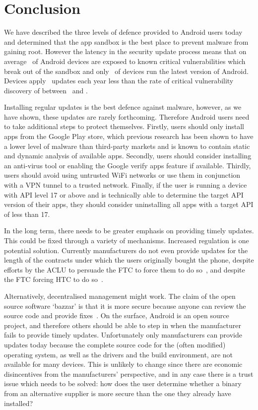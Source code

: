 \documentclass{llncs}
\begin{document}
\section{Conclusion}
\label{sec:conclusion}
We have described the three levels of defence provided to Android users today and determined that the app sandbox is the best place to prevent malware from gaining root.
However the latency in the security update process means that on average \daMeanInsecurityPerc\ of Android devices are exposed to known critical vulnerabilities which break out of the sandbox and only \daUpdatednessPerc\ of devices run the latest version of Android.
Devices apply \daUpdatesPerYear\ updates each year less than the rate of critical vulnerability discovery of between \avoVulnsPerYearAllAndroid\ and \avoVulnsPerYear.

Installing regular updates is the best defence against malware, however, as we have shown, these updates are rarely forthcoming. 
Therefore Android users need to take additional steps to protect themselves. 
Firstly, users should only install apps from the Google Play store, which previous research has been shown to have a lower level of malware than third-party markets and is known to contain static and dynamic analysis of available apps.
Secondly, users should consider installing an anti-virus tool or enabling the Google verify apps feature if available. 
Thirdly, users should avoid using untrusted WiFi networks or use them in conjunction with a VPN tunnel to a trusted network. 
Finally, if the user is running a device with API level 17 or above and is technically able to determine the target API version of their apps, they should consider uninstalling all apps with a target API of less than 17.

In the long term, there needs to be greater emphasis on providing timely updates.
This could be fixed through a variety of mechanisms.
Increased regulation is one potential solution.
Currently manufacturers do not even provide updates for the length of the contracts under which the users originally bought the phone, despite efforts by the ACLU to persuade the FTC to force them to do so~\cite{Soghoian2013}, and despite the FTC forcing HTC to do so~\cite{FTCHTC2013}.

Alternatively, decentralised management might work.
The claim of the open source software `bazzar' is that it is more secure because anyone can review the source code and provide fixes~\cite{Raymond1999}. 
On the surface, Android is an open source project, and therefore others should be able to step in when the manufacturer fails to provide timely updates.
Unfortunately only manufacturers can provide updates today because the complete source code for the (often modified) operating system, as well as the drivers and the build environment, are not available for many devices.
This is unlikely to change since there are economic disincentives from the manufacturers' perspective, and in any case there is a trust issue which needs to be solved: how does the user determine whether a binary from an alternative supplier is more secure than the one they already have installed?
\end{document}
